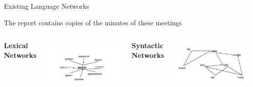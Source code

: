 \documentclass[10pt,xcolor=table]{beamer}
\begin{document}
\begin{frame}{Existing Language Networks}

\begin{block}{}
The report contains copies of the minutes of these meetings
\end{block}

	\begin{columns}


		\textbf{\normalsize Lexical Networks}
		\begin{minipage}[c][0.3\textheight][c]{\linewidth}
		\includegraphics[width=1\linewidth]{image2/Chapitre2/lex_net1.pdf}
		\end{minipage}

		\textbf{\normalsize Syntactic Networks} 
		\begin{minipage}[c][0.3\textheight][c]{\linewidth}
		\includegraphics[width=1\linewidth]{image2/Chapitre2/syn_net1.pdf}
		\end{minipage}
	

\end{columns}
\end{frame}
\end{document}
